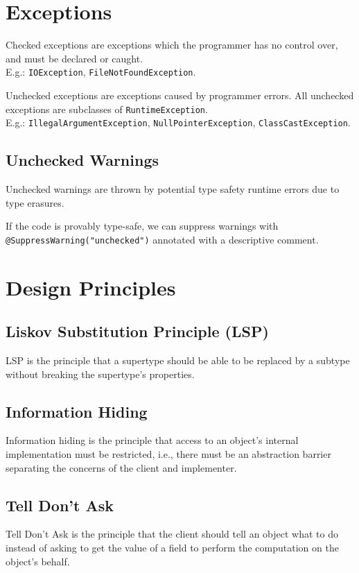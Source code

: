 \documentclass[12pt, a4paper]{article}
\begin{document}
\begin{multicols*}{3}
\colbreak
\section{Exceptions}
Checked exceptions are exceptions which the programmer has no control over, and must be declared or caught.\\E.g.: \lstinline|IOException|, \lstinline|FileNotFoundException|.

Unchecked exceptions are exceptions caused by programmer errors. All unchecked exceptions are subclasses of \lstinline|RuntimeException|.\\E.g.: \lstinline|IllegalArgumentException|, \lstinline|NullPointerException|, \lstinline|ClassCastException|.

\subsection{Unchecked Warnings}
Unchecked warnings are thrown by potential type safety runtime errors due to type erasures.

If the code is provably type-safe, we can suppress warnings with \lstinline|@SuppressWarning("unchecked")| annotated with a descriptive comment.

\section{Design Principles}
\subsection{Liskov Substitution Principle (LSP)}
LSP is the principle that a supertype should be able to be replaced by a subtype without breaking the supertype's properties.
\subsection{Information Hiding}
Information hiding is the principle that access to an object's internal implementation must be restricted, i.e., there must be an abstraction barrier separating the concerns of the client and implementer.

\subsection{Tell Don't Ask}
Tell Don't Ask is the principle that the client should tell an object what to do instead of asking to get the value of a field to perform the computation on the object's behalf.

\end{multicols*}
\end{document}
